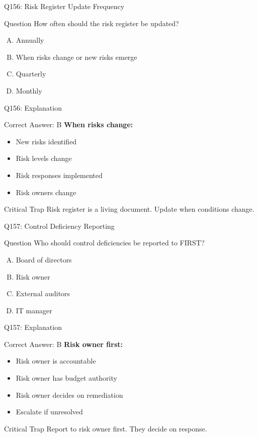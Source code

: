 \documentclass{beamer}
\begin{document}
	\begin{frame}{Q156: Risk Register Update Frequency}
		\begin{block}{Question}
			How often should the risk register be updated?
		\end{block}
		\begin{enumerate}[(A)]
			\item Annually
			\item When risks change or new risks emerge
			\item Quarterly
			\item Monthly
		\end{enumerate}
	\end{frame}
	
	\begin{frame}{Q156: Explanation}
		\begin{block}{Correct Answer: B}
			\textbf{When risks change:}
			\begin{itemize}
				\item New risks identified
				\item Risk levels change
				\item Risk responses implemented
				\item Risk owners change
			\end{itemize}
		\end{block}
		\begin{alertblock}{Critical Trap}
			Risk register is a living document.
			Update when conditions change.
		\end{alertblock}
	\end{frame}
	
	\begin{frame}{Q157: Control Deficiency Reporting}
		\begin{block}{Question}
			Who should control deficiencies be reported to FIRST?
		\end{block}
		\begin{enumerate}[(A)]
			\item Board of directors
			\item Risk owner
			\item External auditors
			\item IT manager
		\end{enumerate}
	\end{frame}
	
	\begin{frame}{Q157: Explanation}
		\begin{block}{Correct Answer: B}
			\textbf{Risk owner first:}
			\begin{itemize}
				\item Risk owner is accountable
				\item Risk owner has budget authority
				\item Risk owner decides on remediation
				\item Escalate if unresolved
			\end{itemize}
		\end{block}
		\begin{alertblock}{Critical Trap}
			Report to risk owner first.
			They decide on response.
		\end{alertblock}
	\end{frame}
	
\end{document}

